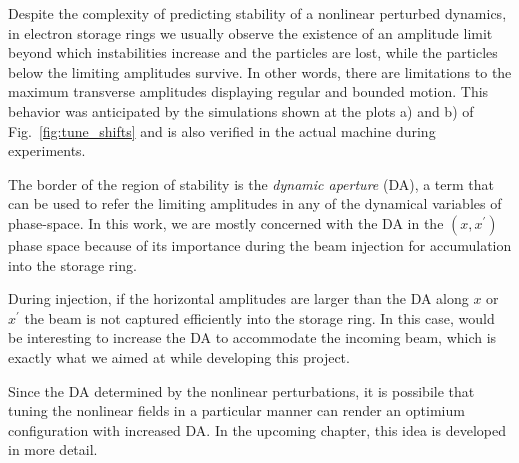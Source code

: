     Despite the complexity of predicting stability of a nonlinear perturbed dynamics, in electron storage rings we usually observe the existence of an amplitude limit beyond which instabilities increase and the particles are lost, while the particles below the limiting amplitudes survive. In other words, there are limitations to the maximum transverse amplitudes displaying regular and bounded motion. This behavior was anticipated by the simulations shown at the plots a) and b) of Fig.~\ref{fig:tune_shifts} and is also verified in the actual machine during experiments.

The border of the region of stability is the \textit{dynamic aperture} (\acrshort*{DA}), a term that can be used to refer the limiting amplitudes in any of the dynamical variables of phase-space. In this work, we are mostly concerned with the \gls*{DA} in the $(x, x^\prime)$ phase space because of its importance during the beam injection for accumulation into the storage ring.

During injection, if the horizontal amplitudes  are larger than the \gls*{DA} along $x$ or $x^\prime$ the beam is not captured  efficiently into the storage ring. In this case, would be interesting to increase the \gls*{DA} to accommodate the incoming beam, which is exactly what we aimed at while developing this project.

Since the \gls*{DA} determined by the nonlinear perturbations, it is possibile that tuning the nonlinear fields in a particular manner can render an optimium configuration with increased \gls*{DA}.  In the upcoming chapter, this idea is developed in more detail.

